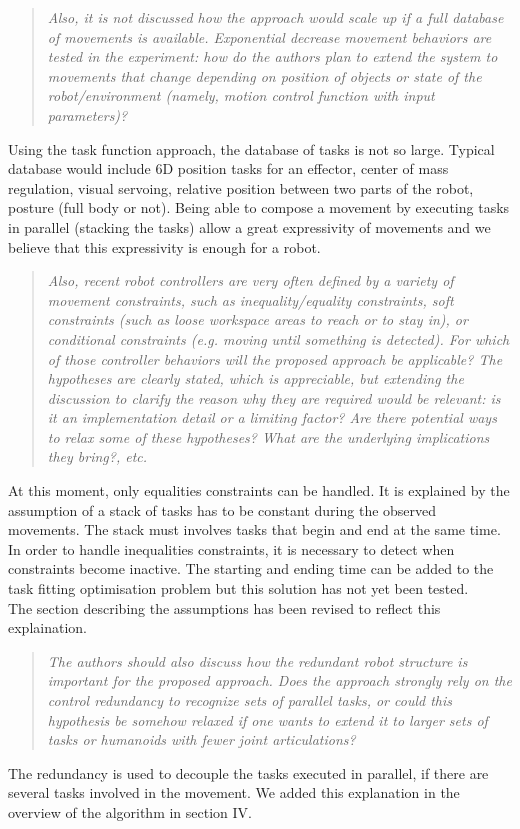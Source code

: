 \documentclass[11pt]{article}
\begin{document}
\begin{quote}
\textit{
Also, it is not discussed how the approach would scale up if a full database of movements is available. Exponential decrease movement behaviors are tested in the experiment: how do the authors plan to extend the system to movements that change depending on position of objects or state of the robot/environment (namely, motion control function with input parameters)?
}
\end{quote}
Using the task function approach,
the database of tasks is not so large. Typical database would include
6D position tasks for an effector, center of mass regulation, 
   visual servoing, relative position between two parts of the robot, 
   posture (full body or not).
  Being able to compose a movement by executing tasks in parallel (stacking the tasks)
  allow a great expressivity of movements and we believe that this expressivity
  is enough for a robot.

\begin{quote}
\textit{
  Also, recent robot controllers are very often defined by a variety of movement constraints, such as inequality/equality constraints, soft constraints (such as loose workspace areas to reach or to stay in), or conditional constraints (e.g. moving until something is detected). For which of those controller behaviors will the proposed approach be applicable?
  The hypotheses are clearly stated, which is appreciable, but extending the discussion to clarify the reason why they are required would be relevant: is it an implementation detail or a limiting factor? Are there potential ways to relax some of these hypotheses? What are the underlying implications they bring?, etc.
}
\end{quote}
At this moment, only equalities constraints can be handled. It is explained by the assumption of a stack
of tasks has to be constant during the observed movements.
The stack must involves tasks that begin and end at the same time.
In order to handle inequalities constraints, it is necessary to detect
when constraints become inactive. The starting and ending time can be added
to the task fitting optimisation problem but this solution has not yet been tested.\\

The section describing the assumptions has been revised to reflect this explaination.

\begin{quote}
\textit{
The authors should also discuss how the redundant robot structure is important for the proposed approach. Does the approach strongly rely on the control redundancy to recognize sets of parallel tasks, or could this hypothesis be somehow relaxed if one wants to extend it to larger sets of tasks or humanoids with fewer joint articulations?
}
\end{quote}
The redundancy is used to decouple the tasks executed in parallel, if there are several tasks involved in the movement.
We added this explanation in the overview of the algorithm in section IV.
\end{document}
